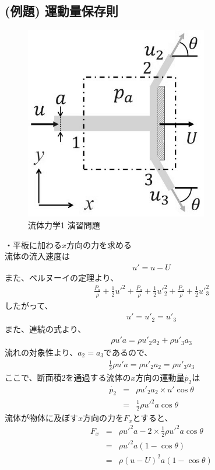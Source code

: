 \documentclass[a4paper]{jsarticle}
\begin{document}
\subsection{(例題) 運動量保存則}
\begin{figure}[htbp]
    \begin{center}
        \includegraphics[width=80mm]{images/ryuriki_image5.jpg}
        \caption{流体力学1 演習問題}
    \end{center}
\end{figure}
・平板に加わる$x$方向の力を求める\\
流体の流入速度は
\begin{eqnarray*}
    u'=u-U
\end{eqnarray*}
また、ベルヌーイの定理より、
\begin{eqnarray*}
    \frac{P_a}{\rho}+\frac{1}{2}{u'}^2+\frac{P_a}{\rho}+\frac{1}{2}{u'}_2^2+\frac{P_a}{\rho}+\frac{1}{2}{u'}_3^2
\end{eqnarray*}
したがって、
\begin{eqnarray*}
    u'={u'}_2={u'}_3
\end{eqnarray*}
また、連続の式より、
\begin{eqnarray*}
    \rho {u'} a= \rho {u'}_2 a_2 + \rho {u'}_3 a_3
\end{eqnarray*}
流れの対象性より、$a_2 = a_3$であるので、
\begin{eqnarray*}
    \frac{1}{2}\rho {u'} a = \rho {u'}_2 a_2 = \rho {u'}_3 a_3
\end{eqnarray*}
ここで、断面積2を通過する流体の$x$方向の運動量$\dot{p_2}$は
\begin{eqnarray*}
    \dot{p_2}&=&\rho {u'}_2 a_2 \times {u'}\cos\theta\\
    &=&\frac{1}{2} \rho {u'}^2 a\cos\theta
\end{eqnarray*}
流体が物体に及ぼす$x$方向の力を$F_x$とすると、
\begin{eqnarray*}
    F_x&=&\rho {u'}^2 a - 2 \times \frac{1}{2} \rho {u'}^2 a\cos\theta\\
    &=&\rho {u'}^2 a \left(1-\cos \theta\right)\\
    &=&\rho \left(u-U\right)^2 a \left(1-\cos \theta\right)\\
\end{eqnarray*}
\end{document}
